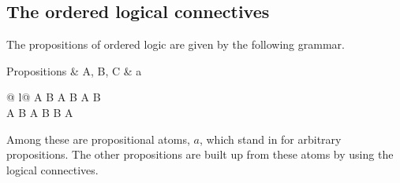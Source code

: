 

\subsection{The ordered logical connectives}

The propositions of ordered logic are given by the following grammar.
\begin{syntax*}
  Propositions & A, B, C &
    a
    \begin{array}[t]{@{{} \mid {}}l@{}}
      A \fuse B \mid \one \mid A \esuf B \mid A \plus B \mid \zero \\
      A \with B \mid \top \mid A \limp B \mid B \pmir A
    \end{array}
\end{syntax*}
Among these are propositional atoms, $a$, which stand in for arbitrary propositions.
The other propositions are built up from these atoms by using the logical connectives.

